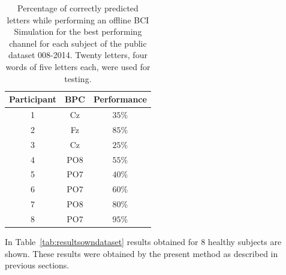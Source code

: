 \documentclass[entropy,article,submit,moreauthors,pdftex,10pt,a4paper]{mdpi}
\begin{document}
\begin{table}[H]
\caption{Percentage of correctly predicted letters while performing an offline BCI Simulation for the best performing channel for each subject of the public dataset 008-2014. Twenty letters, four words of five letters each, were used for testing. }
\centering
\begin{tabular}{ccc}
\toprule
\textbf{Participant}	&  \textbf{BPC}	& \textbf{Performance}\\
\midrule
1     &     Cz   &   $35\%$  \\
2     &     Fz   &   $85\%$  \\
3     &     Cz   &   $25\%$  \\
4     &     PO8 &   $55\%$  \\
5     &     PO7 &   $40\%$ \\
6     &     PO7 &   $60\%$  \\
7     &     PO8 &   $80\%$  \\
8     &     PO7 &   $95\%$ \\

\bottomrule
\end{tabular}
\label{tab:results}
\end{table}

In Table~\ref{tab:resultsowndataset} results obtained for 8 healthy subjects are shown.   These results were obtained by the present method as described in previous sections.  

\end{document}
